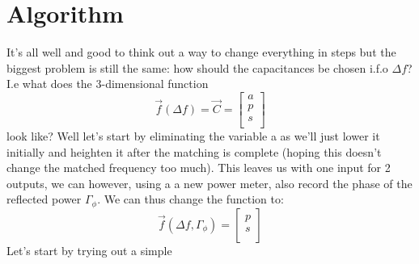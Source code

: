\section{Algorithm}
It's all well and good to think out a way to change everything in steps but the biggest problem
is still the same: how should the capacitances be chosen i.f.o $\Delta f$?
I.e what does the 3-dimensional function
\begin{equation}
	\vec{f}(\Delta f) = \vec{C} = \begin{bmatrix}
a\\
p\\
s\\
\end{bmatrix}
\end{equation}
look like? Well let's start by eliminating the variable a as we'll just lower
it initially and heighten it after the matching is complete (hoping this
doesn't change the matched frequency too much). This leaves us with one input
for 2 outputs, we can however, using a a new power meter, also record the phase
of the reflected power $\Gamma_\phi$.  We can thus change the function to:
\begin{equation}
	\vec{f}(\Delta f, \Gamma_\phi) = 
	\begin{bmatrix}
	p\\
	s\\
	\end{bmatrix}
\end{equation}
Let's start by trying out a simple 

